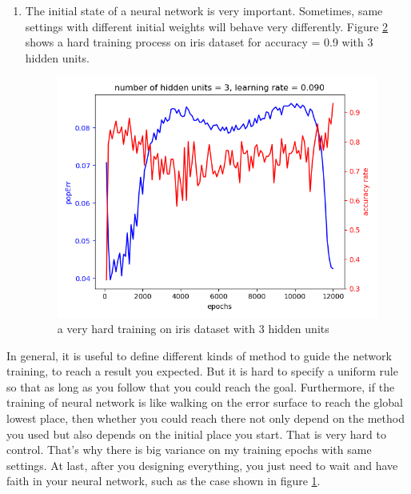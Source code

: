 \documentclass[11pt]{article}
\begin{document}
\begin{enumerate}
\begin{itemize}
\begin{figure}[htb]
\caption{It is lucky that after a long time training, the neural network achieved a high accuracy on 4:4:1 dataset  \label{fig-441}}
\end{figure}
\item 8:3:8: The popErr could be reduced to 0.09, the accuracy is around 0.11 \textasciitilde{} 0.14.
\item iris: After increasing hidden units to 6, the training to high accuracy becomes faster and more steady.
\end{itemize}

\item The initial state of a neural network is very important. Sometimes, same settings with different initial weights will behave very differently. Figure \ref{fig-iris-hard-training} shows a hard training process on iris dataset for accuracy = 0.9 with 3 hidden units. 
\begin{figure}[htb]
\centering
\includegraphics[width=.9\linewidth]{./popErr_vs_accuracy_on_iris_hard_training.png}
\caption{a very hard training on iris dataset with 3 hidden units \label{fig-iris-hard-training}}
\end{figure}
\end{enumerate}


In general, it is useful to define different kinds of method to guide the network training, to reach a result you expected. But it is hard to specify a uniform rule so that as long as you follow that you could reach the goal. Furthermore, if the training of neural network is like walking on the error surface to reach the global lowest place, then whether you could reach there not only depend on the method you used but also depends on the initial place you start. That is very hard to control. That's why there is big variance on my training epochs with same settings. At last, after you designing everything, you just need to wait and have faith in your neural network, such as the case shown in figure \ref{fig-441}.
\end{document}
